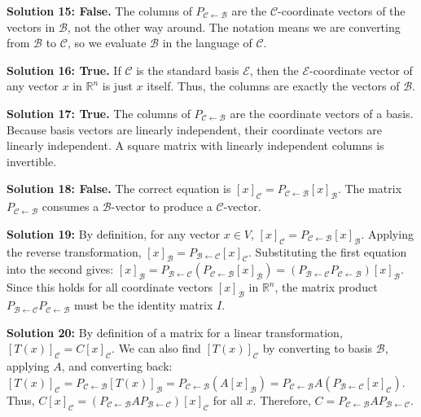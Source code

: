 \documentclass[11pt]{article}
\begin{document}
\vspace{0.5cm}
\textbf{Solution 15: False.} The columns of $P_{\mathcal{C} \leftarrow \mathcal{B}}$ are the $\mathcal{C}$-coordinate vectors of the vectors in $\mathcal{B}$, not the other way around. The notation means we are converting from $\mathcal{B}$ to $\mathcal{C}$, so we evaluate $\mathcal{B}$ in the language of $\mathcal{C}$.

\vspace{0.5cm}
\textbf{Solution 16: True.} If $\mathcal{C}$ is the standard basis $\mathcal{E}$, then the $\mathcal{E}$-coordinate vector of any vector $x$ in $\mathbb{R}^n$ is just $x$ itself. Thus, the columns are exactly the vectors of $\mathcal{B}$.

\vspace{0.5cm}
\textbf{Solution 17: True.} The columns of $P_{\mathcal{C} \leftarrow \mathcal{B}}$ are the coordinate vectors of a basis. Because basis vectors are linearly independent, their coordinate vectors are linearly independent. A square matrix with linearly independent columns is invertible.

\vspace{0.5cm}
\textbf{Solution 18: False.} The correct equation is $[x]_{\mathcal{C}} = P_{\mathcal{C} \leftarrow \mathcal{B}} [x]_{\mathcal{B}}$. The matrix $P_{\mathcal{C} \leftarrow \mathcal{B}}$ consumes a $\mathcal{B}$-vector to produce a $\mathcal{C}$-vector.

\vspace{0.5cm}
\textbf{Solution 19:} By definition, for any vector $x \in V$, $[x]_{\mathcal{C}} = P_{\mathcal{C} \leftarrow \mathcal{B}} [x]_{\mathcal{B}}$.
Applying the reverse transformation, $[x]_{\mathcal{B}} = P_{\mathcal{B} \leftarrow \mathcal{C}} [x]_{\mathcal{C}}$.
Substituting the first equation into the second gives:
$[x]_{\mathcal{B}} = P_{\mathcal{B} \leftarrow \mathcal{C}} (P_{\mathcal{C} \leftarrow \mathcal{B}} [x]_{\mathcal{B}}) = (P_{\mathcal{B} \leftarrow \mathcal{C}} P_{\mathcal{C} \leftarrow \mathcal{B}}) [x]_{\mathcal{B}}$.
Since this holds for all coordinate vectors $[x]_{\mathcal{B}}$ in $\mathbb{R}^n$, the matrix product $P_{\mathcal{B} \leftarrow \mathcal{C}} P_{\mathcal{C} \leftarrow \mathcal{B}}$ must be the identity matrix $I$.

\vspace{0.5cm}
\textbf{Solution 20:} By definition of a matrix for a linear transformation, $[T(x)]_{\mathcal{C}} = C[x]_{\mathcal{C}}$.
We can also find $[T(x)]_{\mathcal{C}}$ by converting to basis $\mathcal{B}$, applying $A$, and converting back:
$[T(x)]_{\mathcal{C}} = P_{\mathcal{C} \leftarrow \mathcal{B}} [T(x)]_{\mathcal{B}} = P_{\mathcal{C} \leftarrow \mathcal{B}} (A [x]_{\mathcal{B}}) = P_{\mathcal{C} \leftarrow \mathcal{B}} A (P_{\mathcal{B} \leftarrow \mathcal{C}} [x]_{\mathcal{C}})$.
Thus, $C[x]_{\mathcal{C}} = (P_{\mathcal{C} \leftarrow \mathcal{B}} A P_{\mathcal{B} \leftarrow \mathcal{C}}) [x]_{\mathcal{C}}$ for all $x$. Therefore, $C = P_{\mathcal{C} \leftarrow \mathcal{B}} A P_{\mathcal{B} \leftarrow \mathcal{C}}$.
\end{document}
